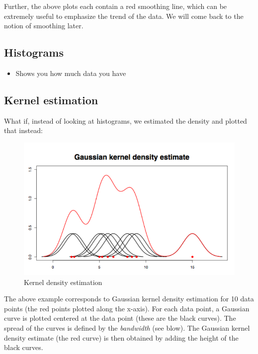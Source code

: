 Further, the above plots each contain a red smoothing line, which can be extremely useful to emphasize the trend of the data. We will come back to the notion of smoothing later.




\subsection*{Histograms}

\begin{itemize}
\item Shows you how much data you have
\end{itemize} 

\subsection*{Kernel estimation}


What if, instead of looking at histograms, we estimated the density and plotted that instead:


\begin{figure}[H]
\begin{center}
\includegraphics[scale=0.5]{voxelkernel.png}
\end{center}
\caption{Kernel density estimation}
\label{fig:kernel}
\end{figure}


The above example corresponds to Gaussian kernel density estimation for 10 data points (the red points plotted along the x-axis). For each data point, a Gaussian curve is plotted centered at the data point (these are the black curves). The spread of the curves is defined by the \emph{bandwidth} (see blow). The Gaussian kernel density estimate (the red curve) is then obtained by adding the height of the black curves.





